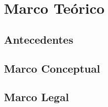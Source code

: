 \chapter{Marco Teórico}
\label{chap:marco_teorico}
\section{Antecedentes}
\section{Marco Conceptual}
\section{Marco Legal}
